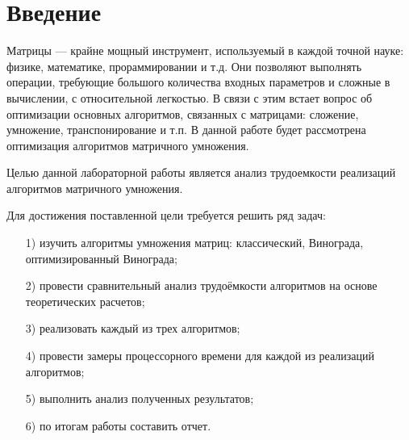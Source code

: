 
\chapter*{Введение}

Матрицы --- крайне мощный инструмент, используемый в каждой точной науке: физике, математике, прораммировании и т.д.
Они позволяют выполнять операции, требующие большого количества входных параметров и сложные в вычислении, с относительной легкостью.
В связи с этим встает вопрос об оптимизации основных алгоритмов, связанных с матрицами: сложение, умножение, транспонирование и т.п.
В данной работе будет рассмотрена оптимизация алгоритмов матричного умножения.

Целью данной лабораторной работы является анализ трудоемкости реализаций алгоритмов матричного умножения.

Для достижения поставленной цели требуется решить ряд задач:
\begin{enumerate}
	\item[1)] изучить алгоритмы умножения матриц: классический, Винограда, оптимизированный Винограда;
	\item[2)] провести сравнительный анализ трудоёмкости алгоритмов на основе теоретических расчетов;
	\item[3)] реализовать каждый из трех алгоритмов;
	\item[4)] провести замеры процессорного времени для каждой из реализаций алгоритмов;
	\item[5)] выполнить анализ полученных результатов;
	\item[6)] по итогам работы составить отчет.
\end{enumerate}

\newpage
